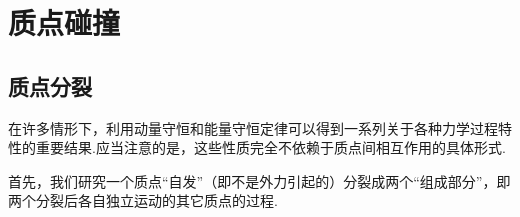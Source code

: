 \chapter{质点碰撞}

\section{质点分裂\protect\footnotemark}

在许多情形下，利用动量守恒和能量守恒定律可以得到一系列关于各种力学过程特性的重要结果.应当注意的是，这些性质完全不依赖于质点间相互作用的具体形式.

首先，我们研究一个质点“自发”（即不是外力引起的）分裂成两个“组成部分”，即两个分裂后各自独立运动的其它质点的过程.

